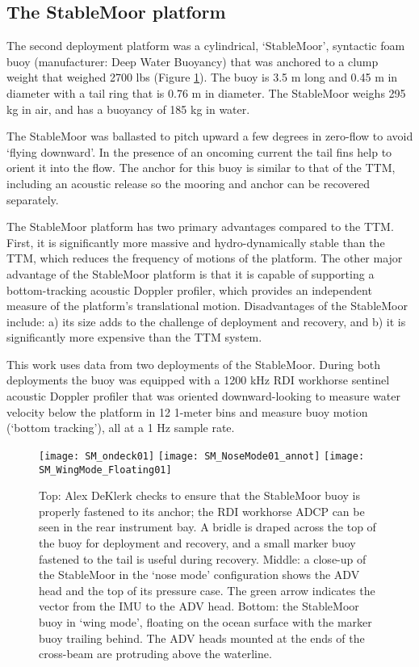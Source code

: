 \subsection{The StableMoor platform}

The second deployment platform was a cylindrical, `StableMoor', syntactic foam buoy (manufacturer: Deep Water Buoyancy) that was anchored to a clump weight that weighed 2700 lbs (Figure \ref{fig:SM}). The buoy is 3.5 m long and 0.45 m in diameter with a tail ring that is 0.76 m in diameter. The StableMoor weighs 295 kg in air, and has a buoyancy of 185 kg in water. 

The StableMoor was ballasted to pitch upward a few degrees in zero-flow to avoid `flying downward'. In the presence of an oncoming current the tail fins help to orient it into the flow. The anchor for this buoy is similar to that of the TTM, including an acoustic release so the mooring and anchor can be recovered separately.

The StableMoor platform has two primary advantages compared to the TTM. First, it is significantly more massive and hydro-dynamically stable than the TTM, which reduces the frequency of motions of the platform. The other major advantage of the StableMoor platform is that it is capable of supporting a bottom-tracking acoustic Doppler profiler, which provides an independent measure of the platform's translational motion. Disadvantages of the StableMoor include: a) its size adds to the challenge of deployment and recovery, and b) it is significantly more expensive than the TTM system.

This work uses data from two deployments of the StableMoor. During both deployments the buoy was equipped with a 1200 kHz RDI workhorse sentinel acoustic Doppler profiler that was oriented downward-looking to measure water velocity below the platform in 12 1-meter bins and measure buoy motion (`bottom tracking'), all at a 1 Hz sample rate. 

\begin{figure}[t]
  \centering
  \texttt{[image: SM\_ondeck01]}
  \texttt{[image: SM\_NoseMode01\_annot]}
  \texttt{[image: SM\_WingMode\_Floating01]}
  \caption{Top: Alex DeKlerk checks to ensure that the StableMoor buoy is properly fastened to its anchor; the RDI workhorse ADCP can be seen in the rear instrument bay. A bridle is draped across the top of the buoy for deployment and recovery, and a small marker buoy fastened to the tail is useful during recovery.  Middle: a close-up of the StableMoor in the `nose mode' configuration shows the ADV head and the top of its pressure case. The green arrow indicates the vector from the IMU to the ADV head. Bottom: the StableMoor buoy in `wing mode', floating on the ocean surface with the marker buoy trailing behind. The ADV heads mounted at the ends of the cross-beam are protruding above the waterline.   }
  \label{fig:SM}
\end{figure}

